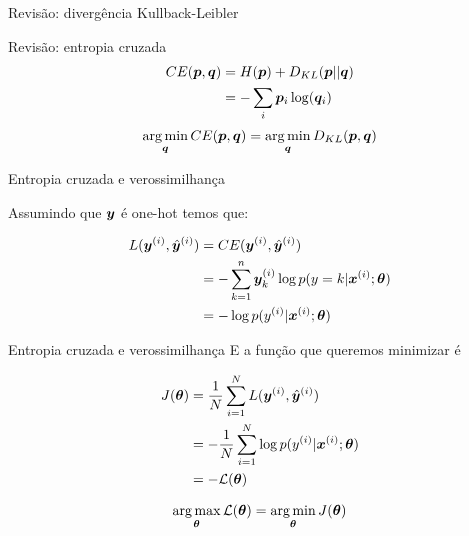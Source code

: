\documentclass[10pt]{beamer}
\begin{document}
\begin{frame}{Revisão: divergência Kullback-Leibler}

\end{frame}

\begin{frame}{Revisão: entropia cruzada}
\Large{
\begin{align*}
CE(\vect{p},\vect{q}) &= H(\vect{p}) + D_{KL}(\vect{p}||\vect{q})\\
\vspace{0.2cm}
&= -\sum_{i}\vect{p}_{i}\log(\vect{q}_{i})
\end{align*}
}
\vspace{0.2cm}
\begin{equation*}
\operatorname*{arg\,min}_{\bm{q}} CE(\bm{p},\bm{q}) =  \operatorname*{arg\,min}_{\bm{q}} D_{KL}(\bm{p},\bm{q})
\end{equation*}
\end{frame}

\begin{frame}[fragile]{Entropia cruzada e verossimilhança}

Assumindo que $\bm{y}$ é one-hot temos que: 

\Large{
\begin{align*}
L(\bm{y}^{(i)}, {\hat{\bm{y}}}^{(i)}) &= CE(\bm{y}^{(i)}, {\hat{\bm{y}}}^{(i)})\\
&= -\sum_{k=1}^{n} \bm{y}^{(i)}_{k}\log p(y=k| \bm{x}^{(i)}; \bm{\theta})\\
&= - \log p(y^{(i)}| \bm{x}^{(i)}; \bm{\theta})\\
\end{align*}
}
\end{frame}

\begin{frame}{Entropia cruzada e verossimilhança}
E a função que queremos minimizar é
\Large{
\begin{align*}
J(\bm{\theta}) &= \frac{1}{N}\sum_{i=1}^{N} L(\bm{y}^{(i)}, {\hat{\bm{y}}}^{(i)})\\
&= - \frac{1}{N}\sum_{i=1}^{N}\log p(y^{(i)}| \bm{x}^{(i)}; \bm{\theta})\\
&= - \mathcal{L}(\bm{\theta})
\end{align*}

\vspace{0.2cm}
\begin{equation*}
\operatorname*{arg\,max}_{\bm{\theta}} \mathcal{L}(\bm{\theta}) =  \operatorname*{arg\,min}_{\bm{\theta}} J(\bm{\theta})
\end{equation*}
}
\end{frame}
\end{document}
